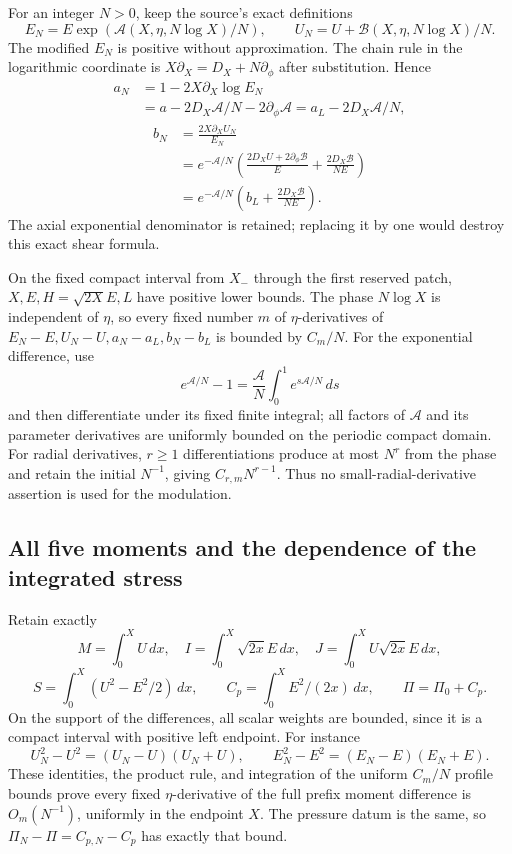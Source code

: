\documentclass[10pt,a4paper]{article}
\begin{document}
For an integer \(N>0\), keep the source's exact definitions \[
E_N=E\exp(\mathcal A(X,\eta,N\log X)/N),\qquad
U_N=U+\mathcal B(X,\eta,N\log X)/N.
\] The modified \(E_N\) is positive without approximation. The chain rule in the logarithmic coordinate is \(X\partial_X=D_X+N\partial_\phi\) after substitution. Hence \[
\begin{aligned}
a_N
&=1-2X\partial_X\log E_N\\
&=a-2D_X\mathcal A/N-2\partial_\phi\mathcal A
=a_L-2D_X\mathcal A/N,
\end{aligned}
\] \[
\begin{aligned}
b_N
&=\frac{2X\partial_XU_N}{E_N}\\
&=e^{-\mathcal A/N}
\left(\frac{2D_XU+2\partial_\phi\mathcal B}{E}
+\frac{2D_X\mathcal B}{NE}\right)\\
&=e^{-\mathcal A/N}
\left(b_L+\frac{2D_X\mathcal B}{NE}\right).
\end{aligned}
\] The axial exponential denominator is retained; replacing it by one would destroy this exact shear formula.

On the fixed compact interval from \(X_-\) through the first reserved patch, \(X,E,H=\sqrt{2X}E,L\) have positive lower bounds. The phase \(N\log X\) is independent of \(\eta\), so every fixed number \(m\) of \(\eta\)-derivatives of \(E_N-E,U_N-U,a_N-a_L,b_N-b_L\) is bounded by \(C_m/N\). For the exponential difference, use \[
e^{\mathcal A/N}-1
=\frac{\mathcal A}N\int_0^1e^{s\mathcal A/N}\,ds
\] and then differentiate under its fixed finite integral; all factors of \(\mathcal A\) and its parameter derivatives are uniformly bounded on the periodic compact domain. For radial derivatives, \(r\ge1\) differentiations produce at most \(N^r\) from the phase and retain the initial \(N^{-1}\), giving \(C_{r,m}N^{r-1}\). Thus no small-radial-derivative assertion is used for the modulation.

\subsection{All five moments and the dependence of the integrated stress}\label{pa:all-five-moments-and-the-dependence-of-the-integrated-stress}

Retain exactly \[
M=\int_0^XU\,dx,\quad I=\int_0^X\sqrt{2x}E\,dx,\quad
J=\int_0^XU\sqrt{2x}E\,dx,
\] \[
S=\int_0^X(U^2-E^2/2)\,dx,\qquad
C_p=\int_0^X E^2/(2x)\,dx,\qquad \Pi=\Pi_0+C_p.
\] On the support of the differences, all scalar weights are bounded, since it is a compact interval with positive left endpoint. For instance \[
U_N^2-U^2=(U_N-U)(U_N+U),\qquad
E_N^2-E^2=(E_N-E)(E_N+E).
\] These identities, the product rule, and integration of the uniform \(C_m/N\) profile bounds prove every fixed \(\eta\)-derivative of the full prefix moment difference is \(O_m(N^{-1})\), uniformly in the endpoint \(X\). The pressure datum is the same, so \(\Pi_N-\Pi=C_{p,N}-C_p\) has exactly that bound.
\end{document}
